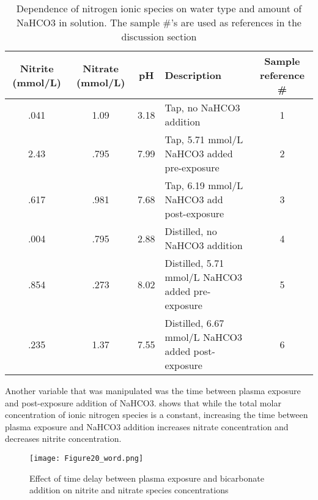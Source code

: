 \begin{table}[htpb]
  \begin{center}
    \begin{tabularx}{\textwidth}{|c |c |c |X |c |}
      \hline
      \textbf{Nitrite (mmol/L)} & \textbf{Nitrate (mmol/L)} & \textbf{pH} & \textbf{Description} & \textbf{Sample reference \#} \\\hline
      .041 & 1.09 & 3.18 & Tap, no NaHCO3 addition & 1 \\\hline
      2.43 & .795 & 7.99 & Tap, 5.71 mmol/L NaHCO3 added pre-exposure & 2 \\\hline
      .617 & .981 & 7.68 & Tap, 6.19 mmol/L NaHCO3 add post-exposure & 3 \\\hline
      .004 & .795 & 2.88 & Distilled, no NaHCO3 addition & 4 \\\hline
      .854 & .273 & 8.02 & Distilled, 5.71 mmol/L NaHCO3 added pre-exposure & 5 \\\hline
      .235 & 1.37 & 7.55 & Distilled, 6.67 mmol/L NaHCO3 added post-exposure & 6 \\\hline
    \end{tabularx}
  \end{center}
  \caption{Dependence of nitrogen ionic species on water type and amount of NaHCO3 in solution.  The sample \#'s are used as references in the discussion section}
  \label{tab:bicarb}
\end{table}

Another variable that was manipulated was the time between plasma exposure and post-exposure addition of NaHCO3.  shows that while the total molar concentration of ionic nitrogen species is a constant, increasing the time between plasma exposure and NaHCO3 addition increases nitrate concentration and decreases nitrite concentration.

\begin{figure}[htbp]
  \centering
  \texttt{[image: Figure20\_word.png]}
  \caption{Effect of time delay between plasma exposure and bicarbonate addition on nitrite and nitrate species concentrations}
  \label{fig:nitrogen_vs_time_delay}
\end{figure}

